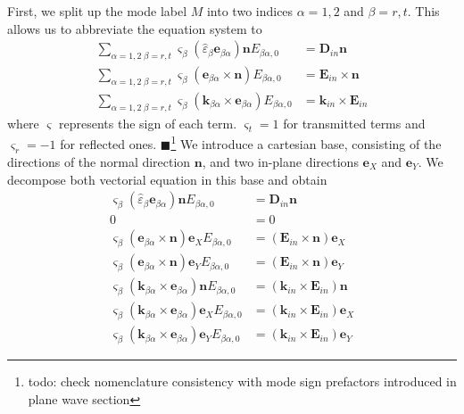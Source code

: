 \documentclass[12pt,a4paper,twoside,openright,BCOR10mm,headsepline,titlepage,abstracton,chapterprefix,final]{scrreprt}
\newcommand\Vector[1]{{\mathbf{#1}}}
\newcommand\wavenumber{k}
\newcommand\Wavevector{\Vector{\wavenumber}}
\newcommand\Tensor[1]{\hat{#1}}
\newcommand\scalarEfield{E}
\newcommand\scalarDfield{D}
\newcommand\Efield{\Vector{\scalarEfield}}
\newcommand\Dfield{\Vector{\scalarDfield}}
\newcommand\permittivity{\Tensor{\scalarpermittivity}}
\newcommand\scalarpermittivity{\varepsilon}
\newcommand{\remark}[1]{{\color{red}$\blacksquare$}\footnote{{\color{red}#1}}}
\begin{document}
First, we split up the mode label $M$ into two indices $\alpha=1,2$ and $\beta=r,t$.
This allows us to abbreviate the equation system to
\begin{subequations}
  \begin{align}
    \sum_{\alpha=1,2\;\beta=r,t} \varsigma_\beta (\permittivity_\beta \Vector{e}_{\beta\alpha})\Vector{n} E_{\beta\alpha,0} &= \Dfield_{in} \Vector{n}                   \label{eq:FresnelSystemEq1} \\
    \sum_{\alpha=1,2\;\beta=r,t} \varsigma_\beta (\Vector{e}_{\beta\alpha} \times \Vector{n} ) E_{\beta\alpha,0} &= \Efield_{in} \times \Vector{n}                        \label{eq:FresnelSystemEq2} \\
    \sum_{\alpha=1,2\;\beta=r,t} \varsigma_\beta ( \Wavevector_{\beta\alpha} \times \Vector{e}_{\beta\alpha} ) E_{\beta\alpha,0} &=  \Wavevector_{in} \times \Efield_{in} \label{eq:FresnelSystemEq3}
  \end{align}
\end{subequations}
where $\varsigma$ represents the sign of each term.
$\varsigma_t=1$ for transmitted terms and $\varsigma_r=-1$ for reflected ones.
\remark{todo: check nomenclature consistency with mode sign prefactors introduced in plane wave section}
We introduce a cartesian base, 
consisting of the directions of the normal direction $\Vector{n}$, 
and two in-plane directions $\Vector{e}_X$ and $\Vector{e}_Y$.
We decompose both vectorial equation in this base and obtain
\begin{subequations}
  \begin{align}
    \varsigma_\beta (\permittivity_\beta \Vector{e}_{\beta\alpha})\Vector{n} E_{\beta\alpha,0} &= \Dfield_{in} \Vector{n} \\
    0 &= 0 \\
    \varsigma_\beta (\Vector{e}_{\beta\alpha} \times \Vector{n} ) \Vector{e}_X E_{\beta\alpha,0} &= (\Efield_{in} \times \Vector{n}) \Vector{e}_X \\
    \varsigma_\beta (\Vector{e}_{\beta\alpha} \times \Vector{n} ) \Vector{e}_Y E_{\beta\alpha,0} &= (\Efield_{in} \times \Vector{n}) \Vector{e}_Y \\
    \varsigma_\beta ( \Wavevector_{\beta\alpha} \times \Vector{e}_{\beta\alpha} ) \Vector{n} E_{\beta\alpha,0} &= (\Wavevector_{in} \times \Efield_{in})\Vector{n} \label{eq:fresnelTripleProductSubEq}\\
    \varsigma_\beta ( \Wavevector_{\beta\alpha} \times \Vector{e}_{\beta\alpha} ) \Vector{e}_X E_{\beta\alpha,0} &= (\Wavevector_{in} \times \Efield_{in}) \Vector{e}_X \\
    \varsigma_\beta ( \Wavevector_{\beta\alpha} \times \Vector{e}_{\beta\alpha} ) \Vector{e}_Y E_{\beta\alpha,0} &= (\Wavevector_{in} \times \Efield_{in}) \Vector{e}_Y
  \end{align}
\end{subequations}
\end{document}
